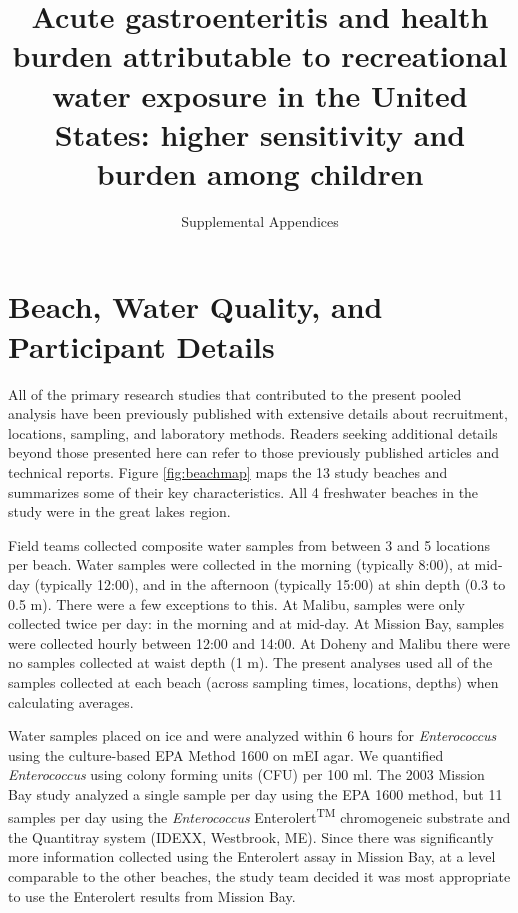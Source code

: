 \documentclass[12pt]{article}\usepackage[]{graphicx}\usepackage[]{color}
\title{Acute gastroenteritis and health burden attributable to recreational water exposure in the United States: higher sensitivity and burden among children}
\author{Supplemental Appendices}
\date{}
\begin{document}
\maketitle
\tableofcontents






\clearpage
\section{Beach, Water Quality, and Participant Details}

All of the primary research studies that contributed to the present pooled analysis have been previously published with extensive details about recruitment, locations, sampling, and laboratory methods. Readers seeking additional details beyond those presented here can refer to those previously published articles and technical reports.\supercite{Colford2005-nb, Colford2007-mc,Wade2006-pp,Wade2008-xj,Wade2010-bb,Wade2010-ps,Colford2012-um,Arnold2013-xd,Yau2014-pl} Figure \ref{fig:beachmap} maps the 13 study beaches and summarizes some of their key characteristics. All 4 freshwater beaches in the study were in the great lakes region. 

Field teams collected composite water samples from between 3 and 5 locations per beach. Water samples were collected in the morning (typically 8:00), at mid-day (typically 12:00), and in the afternoon (typically 15:00) at shin depth (0.3 to 0.5 m).  There were a few exceptions to this. At Malibu, samples were only collected twice per day: in the morning and at mid-day. At Mission Bay, samples were collected hourly between 12:00 and 14:00. At Doheny and Malibu there were no samples collected at waist depth (1 m).  The present analyses used all of the samples collected at each beach (across sampling times, locations, depths) when calculating averages.

Water samples placed on ice and were analyzed within 6 hours for \textit{Enterococcus} using the culture-based EPA Method 1600\supercite{Epa2009-dm} on mEI agar.  We quantified \textit{Enterococcus} using colony forming units (CFU) per 100 ml.  The 2003 Mission Bay study analyzed a single sample per day using the EPA 1600 method, but 11 samples per day using the \textit{Enterococcus} Enterolert\textsuperscript{TM} chromogeneic substrate and the Quantitray system (IDEXX, Westbrook, ME). Since there was significantly more information collected using the Enterolert assay in Mission Bay, at a level comparable to the other beaches, the study team decided it was most appropriate to use the Enterolert results from Mission Bay.
\end{document}
